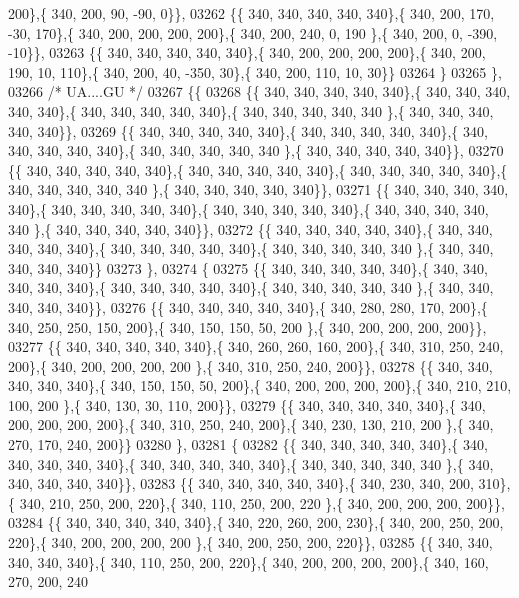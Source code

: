 \begin{DoxyCode}
      200\},\{ 340, 200,  90, -90,   0\}\},
03262 \{\{ 340, 340, 340, 340, 340\},\{ 340, 200, 170, -30, 170\},\{ 340, 200, 200, 200, 200\},\{ 340, 200, 240,   0, 190
      \},\{ 340, 200,   0, -390, -10\}\},
03263 \{\{ 340, 340, 340, 340, 340\},\{ 340, 200, 200, 200, 200\},\{ 340, 200, 190,  10, 110\},\{ 340, 200,  40, -350,  
      30\},\{ 340, 200, 110,  10,  30\}\}
03264 \}
03265 \},
03266 \textcolor{comment}{/* UA....GU */}
03267 \{\{
03268 \{\{ 340, 340, 340, 340, 340\},\{ 340, 340, 340, 340, 340\},\{ 340, 340, 340, 340, 340\},\{ 340, 340, 340, 340, 340
      \},\{ 340, 340, 340, 340, 340\}\},
03269 \{\{ 340, 340, 340, 340, 340\},\{ 340, 340, 340, 340, 340\},\{ 340, 340, 340, 340, 340\},\{ 340, 340, 340, 340, 340
      \},\{ 340, 340, 340, 340, 340\}\},
03270 \{\{ 340, 340, 340, 340, 340\},\{ 340, 340, 340, 340, 340\},\{ 340, 340, 340, 340, 340\},\{ 340, 340, 340, 340, 340
      \},\{ 340, 340, 340, 340, 340\}\},
03271 \{\{ 340, 340, 340, 340, 340\},\{ 340, 340, 340, 340, 340\},\{ 340, 340, 340, 340, 340\},\{ 340, 340, 340, 340, 340
      \},\{ 340, 340, 340, 340, 340\}\},
03272 \{\{ 340, 340, 340, 340, 340\},\{ 340, 340, 340, 340, 340\},\{ 340, 340, 340, 340, 340\},\{ 340, 340, 340, 340, 340
      \},\{ 340, 340, 340, 340, 340\}\}
03273 \},
03274 \{
03275 \{\{ 340, 340, 340, 340, 340\},\{ 340, 340, 340, 340, 340\},\{ 340, 340, 340, 340, 340\},\{ 340, 340, 340, 340, 340
      \},\{ 340, 340, 340, 340, 340\}\},
03276 \{\{ 340, 340, 340, 340, 340\},\{ 340, 280, 280, 170, 200\},\{ 340, 250, 250, 150, 200\},\{ 340, 150, 150,  50, 200
      \},\{ 340, 200, 200, 200, 200\}\},
03277 \{\{ 340, 340, 340, 340, 340\},\{ 340, 260, 260, 160, 200\},\{ 340, 310, 250, 240, 200\},\{ 340, 200, 200, 200, 200
      \},\{ 340, 310, 250, 240, 200\}\},
03278 \{\{ 340, 340, 340, 340, 340\},\{ 340, 150, 150,  50, 200\},\{ 340, 200, 200, 200, 200\},\{ 340, 210, 210, 100, 200
      \},\{ 340, 130,  30, 110, 200\}\},
03279 \{\{ 340, 340, 340, 340, 340\},\{ 340, 200, 200, 200, 200\},\{ 340, 310, 250, 240, 200\},\{ 340, 230, 130, 210, 200
      \},\{ 340, 270, 170, 240, 200\}\}
03280 \},
03281 \{
03282 \{\{ 340, 340, 340, 340, 340\},\{ 340, 340, 340, 340, 340\},\{ 340, 340, 340, 340, 340\},\{ 340, 340, 340, 340, 340
      \},\{ 340, 340, 340, 340, 340\}\},
03283 \{\{ 340, 340, 340, 340, 340\},\{ 340, 230, 340, 200, 310\},\{ 340, 210, 250, 200, 220\},\{ 340, 110, 250, 200, 220
      \},\{ 340, 200, 200, 200, 200\}\},
03284 \{\{ 340, 340, 340, 340, 340\},\{ 340, 220, 260, 200, 230\},\{ 340, 200, 250, 200, 220\},\{ 340, 200, 200, 200, 200
      \},\{ 340, 200, 250, 200, 220\}\},
03285 \{\{ 340, 340, 340, 340, 340\},\{ 340, 110, 250, 200, 220\},\{ 340, 200, 200, 200, 200\},\{ 340, 160, 270, 200, 240

\end{DoxyCode}
